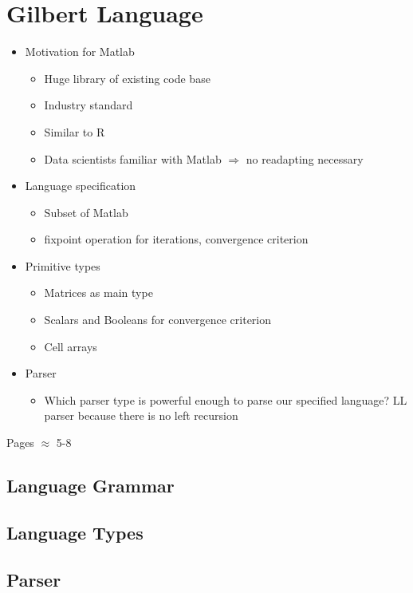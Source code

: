 \chapter{Gilbert Language}
\label{cha:gilbertlanguage}

\begin{itemize}
	\item Motivation for Matlab
	\begin{itemize}
		\item Huge library of existing code base
		\item Industry standard
		\item Similar to R
		\item Data scientists familiar with Matlab $\Rightarrow$ no readapting necessary
	\end{itemize}
	\item Language specification
	\begin{itemize}
		\item Subset of Matlab
		\item fixpoint operation for iterations, convergence criterion
	\end{itemize}
	\item Primitive types
	\begin{itemize}
		\item Matrices as main type
		\item Scalars and Booleans for convergence criterion
		\item Cell arrays
	\end{itemize}
	\item Parser
	\begin{itemize}
		\item Which parser type is powerful enough to parse our specified language? LL parser because there is no left recursion
	\end{itemize}
\end{itemize}

Pages $\approx$ 5-8

\section{Language Grammar}
\section{Language Types}
\section{Parser}

